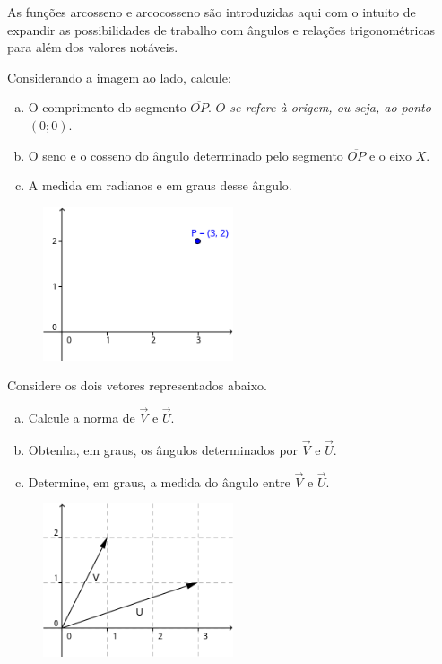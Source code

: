 \documentclass[main_estudante.tex]{subfiles}
\begin{document}
As funções arcosseno e arcocosseno são introduzidas aqui com o intuito de expandir as possibilidades de trabalho com ângulos e relações trigonométricas para além dos valores notáveis.

\begin{questao}
Considerando a imagem ao lado, calcule:
\begin{enumerate}[a)]
\item O comprimento do segmento $\overline{OP}$. \textit{$O$ se refere à origem, ou seja, ao ponto $(0;0)$}.
\item O seno e o cosseno do ângulo determinado pelo segmento $\overline{OP}$ e o eixo $X$. 
\item A medida em radianos e em graus desse ângulo.
\end{enumerate}
\end{questao}

\begin{figure}[h]
\centering
\includegraphics[width=0.5\textwidth]{./img/c4q5.png}
\end{figure}

\begin{questao}
Considere os dois vetores representados abaixo.
\begin{enumerate}[a)]
\item Calcule a norma de $\overrightarrow{V}$ e $\overrightarrow{U}$.
\item Obtenha, em graus, os ângulos determinados por $\overrightarrow{V}$ e $\overrightarrow{U}$.
\item Determine, em graus, a medida do ângulo entre $\overrightarrow{V}$ e $\overrightarrow{U}$.
\end{enumerate}
\end{questao}

\begin{figure}[h]
\centering
\includegraphics[width=0.5\textwidth]{./img/c4q6.png}
\end{figure}
\end{document}
